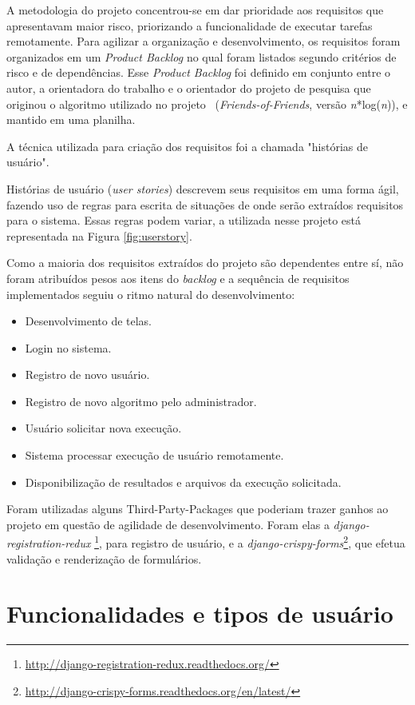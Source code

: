 \documentclass[tg]{mdtufsm}
\begin{document}
A metodologia do projeto concentrou-se em dar prioridade aos requisitos que apresentavam maior risco, priorizando a funcionalidade de executar tarefas remotamente. Para agilizar a organização e desenvolvimento, os requisitos foram organizados em um \emph{Product Backlog} no qual foram listados segundo critérios de risco e de dependências. Esse \emph{Product Backlog} foi definido em conjunto entre o autor, a orientadora do trabalho e o orientador do projeto de pesquisa que originou o algoritmo utilizado no projeto ~(\emph{Friends-of-Friends}, versão \emph{n}*log(\emph{n})), e mantido em uma planilha.

A técnica utilizada para criação dos requisitos foi a chamada "histórias de usuário".

Histórias de usuário (\emph{user stories}) descrevem seus requisitos em uma forma ágil, fazendo uso de regras para escrita de situações de onde serão extraídos requisitos para o sistema. Essas regras podem variar, a utilizada nesse projeto está representada na Figura \ref{fig:userstory}.

Como a maioria dos requisitos extraídos do projeto são dependentes entre sí, não foram atribuídos pesos aos itens do \emph{backlog} e a sequência de requisitos implementados seguiu o ritmo natural do desenvolvimento:
\begin{itemize}
	\item Desenvolvimento de telas.
	\item Login no sistema.
	\item Registro de novo usuário.
	\item Registro de novo algoritmo pelo administrador.
	\item Usuário solicitar nova execução.
	\item Sistema processar execução de usuário remotamente.
	\item Disponibilização de resultados e arquivos da execução solicitada.
\end{itemize}

Foram utilizadas alguns Third-Party-Packages que poderiam trazer ganhos ao projeto em questão de agilidade de desenvolvimento. Foram elas a \emph{django-registration-redux} \footnote{\url{http://django-registration-redux.readthedocs.org/}}, para registro de usuário, e a \emph{django-crispy-forms}\footnote{\url{http://django-crispy-forms.readthedocs.org/en/latest/}}, que efetua validação e renderização de formulários.

\section{Funcionalidades e tipos de usuário}
\end{document}
